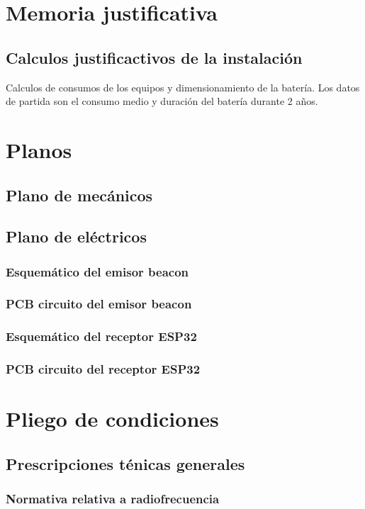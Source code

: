 \documentclass[a4paper ,12pt, onecolumn]{article}
\begin{document}
\section{Memoria justificativa}
    \subsection{Calculos justificactivos de la instalación}
        Calculos de consumos de los equipos y dimensionamiento de la batería.
        Los datos de partida son el consumo medio y duración del batería durante 2 años.
\section{Planos}
    \subsection{Plano de mecánicos}
    \subsection{Plano de eléctricos}
        \subsubsection{Esquemático del emisor beacon}
        \subsubsection{PCB circuito del emisor beacon}
        \subsubsection{Esquemático del receptor ESP32}
        \subsubsection{PCB circuito del receptor ESP32}
\section{Pliego de condiciones}
    \subsection{Prescripciones ténicas generales}
        \subsubsection{Normativa relativa a radiofrecuencia}
\end{document}
